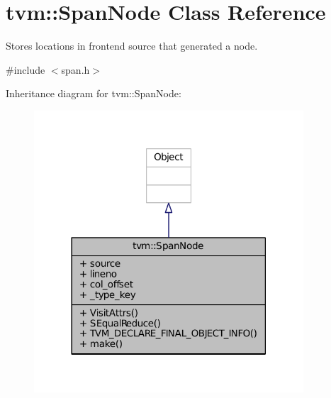 \hypertarget{classtvm_1_1SpanNode}{}\section{tvm\+:\+:Span\+Node Class Reference}
\label{classtvm_1_1SpanNode}


Stores locations in frontend source that generated a node.  




{\ttfamily \#include $<$span.\+h$>$}



Inheritance diagram for tvm\+:\+:Span\+Node\+:
\nopagebreak
\begin{figure}[H]
\begin{center}
\leavevmode
\includegraphics[width=285pt]{classtvm_1_1SpanNode__inherit__graph}
\end{center}
\end{figure}


